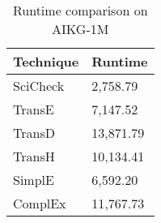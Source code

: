 \begin{table}[!htp]
    \begin{center}
    \begin{tabular}{ M{2.5cm} | M{3.5cm} }
    \hline\rule{0pt}{12pt}
    \textbf{Technique} & \textbf{Runtime}  \\
    
    \hline%
    SciCheck & 2,758.79 \\ 
    TransE & 7,147.52 \\ 
    TransD & 13,871.79 \\ 
    TransH & 10,134.41 \\
    SimplE & 6,592.20 \\
    ComplEx & 11,767.73 \\ \hline
    \end{tabular}
    \caption{Runtime comparison on AIKG-1M}
    \label{table:sci-times-comp}
    \end{center}
\end{table}
    